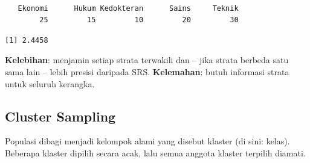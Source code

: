 \documentclass[
  indonesian,
  letterpaper,
]{book}
\newenvironment{Shaded}{\begin{snugshade}}{\end{snugshade}}
\newcommand{\AttributeTok}[1]{\textcolor[rgb]{0.40,0.45,0.13}{#1}}
\newcommand{\CommentTok}[1]{\textcolor[rgb]{0.37,0.37,0.37}{#1}}
\newcommand{\ControlFlowTok}[1]{\textcolor[rgb]{0.00,0.23,0.31}{\textbf{#1}}}
\newcommand{\DecValTok}[1]{\textcolor[rgb]{0.68,0.00,0.00}{#1}}
\newcommand{\FunctionTok}[1]{\textcolor[rgb]{0.28,0.35,0.67}{#1}}
\newcommand{\NormalTok}[1]{\textcolor[rgb]{0.00,0.23,0.31}{#1}}
\newcommand{\OtherTok}[1]{\textcolor[rgb]{0.00,0.23,0.31}{#1}}
\newcommand{\SpecialCharTok}[1]{\textcolor[rgb]{0.37,0.37,0.37}{#1}}
\begin{document}
\begin{Shaded}
\end{Shaded}

\begin{verbatim}

   Ekonomi      Hukum Kedokteran      Sains     Teknik 
        25         15         10         20         30 
\end{verbatim}

\begin{Shaded}
\end{Shaded}

\begin{verbatim}
[1] 2.4458
\end{verbatim}

\textbf{Kelebihan}: menjamin setiap strata terwakili dan -- jika strata
berbeda satu sama lain -- lebih presisi daripada SRS.
\textbf{Kelemahan}: butuh informasi strata untuk seluruh kerangka.

\subsection{Cluster Sampling}\label{cluster-sampling}

Populasi dibagi menjadi kelompok alami yang disebut klaster (di sini:
kelas). Beberapa klaster dipilih secara acak, lalu semua anggota klaster
terpilih diamati.

\begin{Shaded}
\end{Shaded}
\end{document}
